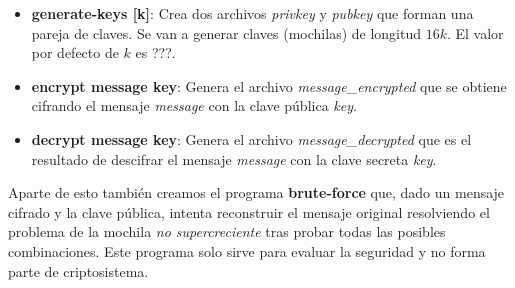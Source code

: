 \documentclass[12pt]{article}
\begin{document}
\begin{itemize}
	\item \textbf{generate-keys [k]}: Crea dos archivos \textit{privkey} y \textit{pubkey} que forman una pareja de claves. Se van a generar claves (mochilas) de longitud $16k$. El valor por defecto de $k$ es ???.
	\item \textbf{encrypt message key}: Genera el archivo \textit{message\_encrypted} que se obtiene cifrando el mensaje \textit{message} con la clave pública \textit{key}.
	\item \textbf{decrypt message key}: Genera el archivo \textit{message\_decrypted} que es el resultado de descifrar el mensaje \textit{message} con la clave secreta \textit{key}.
\end{itemize}
Aparte de esto también creamos el programa \textbf{brute-force} que, dado un mensaje cifrado y la clave pública, intenta reconstruir el mensaje original resolviendo el problema de la mochila \emph{no supercreciente} tras probar todas las posibles combinaciones. Este programa solo sirve para evaluar la seguridad y no forma parte de criptosistema.



 
 
\end{document}
